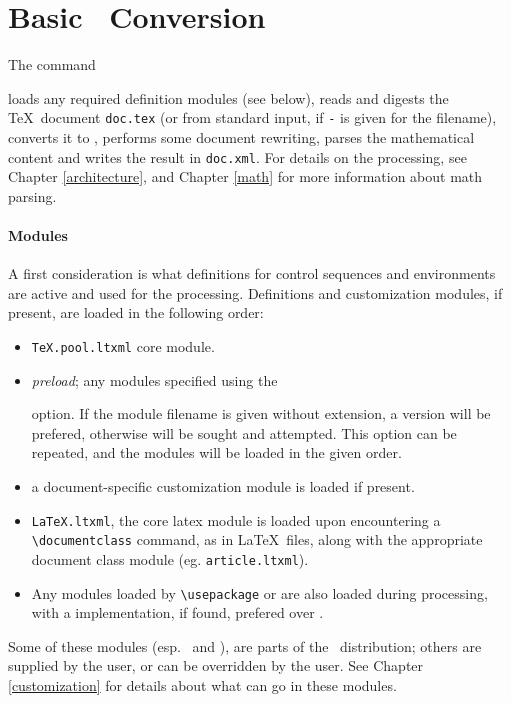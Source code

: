 \documentclass{report}
\begin{document}
\section[Conversion]{Basic \XML\ Conversion}\label{usage.conversion}
The command
\begin{quote}
\end{quote}
loads any required definition modules (see below),
reads and digests the \TeX\ document \texttt{doc.tex}
(or from standard input, if \texttt{-} is given for the filename),
converts it to \XML,
performs some document rewriting, parses the mathematical content
and writes the result in \texttt{doc.xml}.
For details on the processing, see Chapter \ref{architecture},
and Chapter \ref{math} for more information about math parsing.

\paragraph{Modules}
A first consideration is what definitions for control sequences and
environments are active and used for the processing.
Definitions and customization modules, if present, are loaded in the following
order:
\begin{itemize}
  \item \texttt{TeX.pool.ltxml} core module.
  \item \textit{preload}; any modules specified using the
    \begin{quote}
    \end{quote}
    option. If the module filename is given without extension,
    a  version will be prefered, otherwise  will
    be sought and attempted.
    This option can be repeated, and the modules will be loaded in the
    given order.
  \item {} a document-specific customization module
    is loaded if present.
  \item \texttt{LaTeX.ltxml}, the core latex module is loaded
    upon encountering a \verb|\documentclass| command, as in \LaTeX\ files,
    along with the appropriate document class module (eg. \texttt{article.ltxml}).
  \item Any modules loaded by \verb|\usepackage| or \verb|| are
    also loaded during processing, with a  implementation, if found,
    prefered over .
\end{itemize}
Some of these modules (esp.~ and ), are parts of
the \LaTeXML\ distribution; others are supplied by the user, or can be
overridden by the user.
See Chapter \ref{customization} for details about what can go in these modules.
\end{document}
